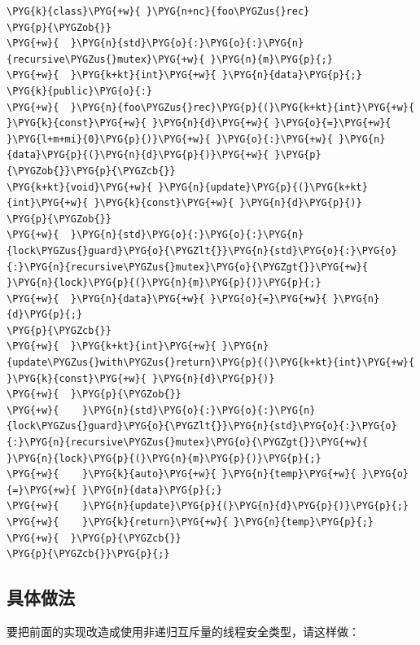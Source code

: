 \begin{codeblockbg}
\begin{Verbatim}[commandchars=\\\{\},breaklines=true,breakanywhere=true,fontsize=\codefont,xleftmargin=17bp]
\PYG{k}{class}\PYG{+w}{ }\PYG{n+nc}{foo\PYGZus{}rec}
\PYG{p}{\PYGZob{}}
\PYG{+w}{  }\PYG{n}{std}\PYG{o}{:}\PYG{o}{:}\PYG{n}{recursive\PYGZus{}mutex}\PYG{+w}{ }\PYG{n}{m}\PYG{p}{;}
\PYG{+w}{  }\PYG{k+kt}{int}\PYG{+w}{ }\PYG{n}{data}\PYG{p}{;}
\PYG{k}{public}\PYG{o}{:}
\PYG{+w}{  }\PYG{n}{foo\PYGZus{}rec}\PYG{p}{(}\PYG{k+kt}{int}\PYG{+w}{ }\PYG{k}{const}\PYG{+w}{ }\PYG{n}{d}\PYG{+w}{ }\PYG{o}{=}\PYG{+w}{ }\PYG{l+m+mi}{0}\PYG{p}{)}\PYG{+w}{ }\PYG{o}{:}\PYG{+w}{ }\PYG{n}{data}\PYG{p}{(}\PYG{n}{d}\PYG{p}{)}\PYG{+w}{ }\PYG{p}{\PYGZob{}}\PYG{p}{\PYGZcb{}}
\PYG{k+kt}{void}\PYG{+w}{ }\PYG{n}{update}\PYG{p}{(}\PYG{k+kt}{int}\PYG{+w}{ }\PYG{k}{const}\PYG{+w}{ }\PYG{n}{d}\PYG{p}{)}
\PYG{p}{\PYGZob{}}
\PYG{+w}{  }\PYG{n}{std}\PYG{o}{:}\PYG{o}{:}\PYG{n}{lock\PYGZus{}guard}\PYG{o}{\PYGZlt{}}\PYG{n}{std}\PYG{o}{:}\PYG{o}{:}\PYG{n}{recursive\PYGZus{}mutex}\PYG{o}{\PYGZgt{}}\PYG{+w}{ }\PYG{n}{lock}\PYG{p}{(}\PYG{n}{m}\PYG{p}{)}\PYG{p}{;}
\PYG{+w}{  }\PYG{n}{data}\PYG{+w}{ }\PYG{o}{=}\PYG{+w}{ }\PYG{n}{d}\PYG{p}{;}
\PYG{p}{\PYGZcb{}}
\PYG{+w}{  }\PYG{k+kt}{int}\PYG{+w}{ }\PYG{n}{update\PYGZus{}with\PYGZus{}return}\PYG{p}{(}\PYG{k+kt}{int}\PYG{+w}{ }\PYG{k}{const}\PYG{+w}{ }\PYG{n}{d}\PYG{p}{)}
\PYG{+w}{  }\PYG{p}{\PYGZob{}}
\PYG{+w}{    }\PYG{n}{std}\PYG{o}{:}\PYG{o}{:}\PYG{n}{lock\PYGZus{}guard}\PYG{o}{\PYGZlt{}}\PYG{n}{std}\PYG{o}{:}\PYG{o}{:}\PYG{n}{recursive\PYGZus{}mutex}\PYG{o}{\PYGZgt{}}\PYG{+w}{ }\PYG{n}{lock}\PYG{p}{(}\PYG{n}{m}\PYG{p}{)}\PYG{p}{;}
\PYG{+w}{    }\PYG{k}{auto}\PYG{+w}{ }\PYG{n}{temp}\PYG{+w}{ }\PYG{o}{=}\PYG{+w}{ }\PYG{n}{data}\PYG{p}{;}
\PYG{+w}{    }\PYG{n}{update}\PYG{p}{(}\PYG{n}{d}\PYG{p}{)}\PYG{p}{;}
\PYG{+w}{    }\PYG{k}{return}\PYG{+w}{ }\PYG{n}{temp}\PYG{p}{;}
\PYG{+w}{  }\PYG{p}{\PYGZcb{}}
\PYG{p}{\PYGZcb{}}\PYG{p}{;}
\end{Verbatim}
\end{codeblockbg}



\subsection{具体做法}



要把前面的实现改造成使用非递归互斥量的线程安全类型，请这样做：


